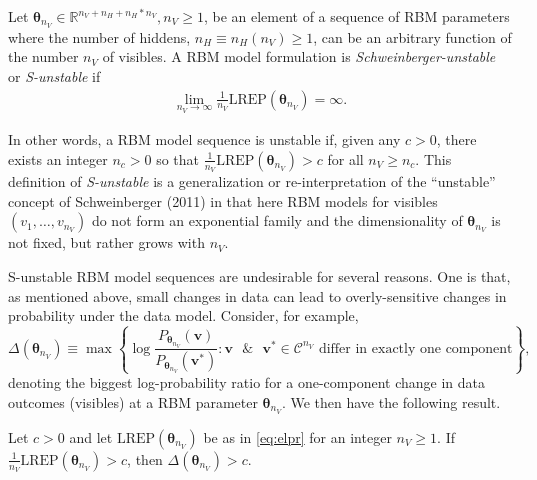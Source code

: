 \documentclass[AMS,STIX1COL]{WileyNJD-v2}
\newcommand{\nv}{{n_{\scriptscriptstyle V}}}
\newcommand{\nh}{{n_{\scriptscriptstyle H}}}
\begin{document}
\begin{definition}
Let $\boldsymbol \theta_\nv \in \mathbb{R}^{\nv + \nh +  \nh*\nv}, \nv \ge 1$, be an element of a sequence of RBM parameters where the number of hiddens, $\nh \equiv \nh(\nv) \ge 1$, can be an arbitrary function of the number $\nv$ of visibles. A RBM model formulation is \emph{Schweinberger-unstable} or \emph{S-unstable} if
\begin{align*}
\lim\limits_{\nv \rightarrow \infty} \frac{1}{\nv} \text{LREP}(\boldsymbol \theta_\nv) = \infty.
\end{align*}
\end{definition}

In other words, a RBM model sequence is unstable if, given any
\(c > 0\), there exists an integer \(n_c > 0\) so that
\(\frac{1}{\nv}\text{LREP}(\boldsymbol \theta_\nv) > c\) for all
\(\nv \ge n_c\). This definition of \emph{S-unstable} is a
generalization or re-interpretation of the ``unstable'' concept of
Schweinberger (2011) in that here RBM models for visibles
\((v_1, \dots, v_\nv)\) do not form an exponential family and the
dimensionality of \(\boldsymbol \theta_\nv\) is not fixed, but rather
grows with \(\nv\).

S-unstable RBM model sequences are undesirable for several reasons. One
is that, as mentioned above, small changes in data can lead to
overly-sensitive changes in probability under the data model. Consider,
for example, \[
\Delta(\boldsymbol \theta_\nv) \equiv \max \left\{\log \frac{P_{\boldsymbol \theta_\nv}(\boldsymbol v)}{P_{\boldsymbol \theta_\nv}(\boldsymbol v^*)} : \boldsymbol v \text{ }\& \text{ } \boldsymbol v^* \in \mathcal{C}^\nv \text{ differ in exactly one component}\right\},
\] denoting the biggest log-probability ratio for a one-component change
in data outcomes (visibles) at a RBM parameter
\(\boldsymbol \theta_\nv\). We then have the following result.

\begin{proposition}
\label{prp:instab1}
Let $c > 0$ and let $\text{LREP}(\boldsymbol \theta_\nv)$ be as in \eqref{eq:elpr} for an integer $\nv \ge 1$. If $\frac{1}{\nv}\text{LREP}(\boldsymbol \theta_\nv) > c$, then $\Delta(\boldsymbol \theta_\nv) > c$.
\end{proposition}
\end{document}
